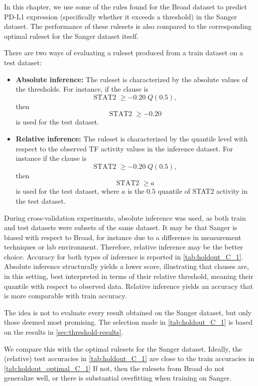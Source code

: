In this chapter, we use some of the rules found for the Broad dataset to predict PD-L1 expression
(specifically whether it exceeds a threshold) in the Sanger dataset.
The performance of these rulesets is also compared to the corresponding optimal ruleset for the Sanger dataset itself.

There are two ways of evaluating a ruleset produced from a train dataset on a test dataset:
\begin{itemize}
    \item \textbf{Absolute inference:} The ruleset is characterized by the absolute values of the thresholds.
    For instance, if the clause is \[\text{STAT2 $\geq -0.20 \; Q(0.5)$},\]
    then \[\text{STAT2 $\geq -0.20$}\] is used for the test dataset.
    \item \textbf{Relative inference:} The ruleset is characterized by the quantile level
    with respect to the observed TF activity values in the inference dataset.
    For instance if the clause is \[\text{STAT2 $\geq -0.20 \; Q(0.5)$},\]
    then \[\text{STAT2 $\geq a$}\] is used for the test dataset,
    where $a$ is the $0.5$ quantile of STAT2 activity in the test dataset.
\end{itemize}
During cross-validation experiments, absolute inference was used, as both train and test datasets were subsets of
the same dataset.
It may be that Sanger is biased with respect to Broad,
for instance due to a difference in measurement techniques or lab environment.
Therefore, relative inference may be the better choice.
Accuracy for both types of inference is reported in \autoref{tab:holdout_C_1}.
Absolute inference structurally yields a lower score, illustrating that clauses are, in this setting, best
interpreted in terms of their relative threshold, meaning their quantile with respect to observed data.
Relative inference yields an accuracy that is more comparable with train accuracy.

The idea is not to evaluate every result obtained on the Sanger dataset, but only those deemed most promising.
The selection made in \autoref{tab:holdout_C_1} is based on the results in \autoref{sec:threshold-results}.

We compare this with the optimal rulesets for the Sanger dataset.
Ideally, the (relative) test accuracies  in \autoref{tab:holdout_C_1} are close to the train accuracies in \autoref{tab:holdout_optimal_C_1}
If not, then the rulesets from Broad do not generalize well, or there is substantial overfitting when training on Sanger.

